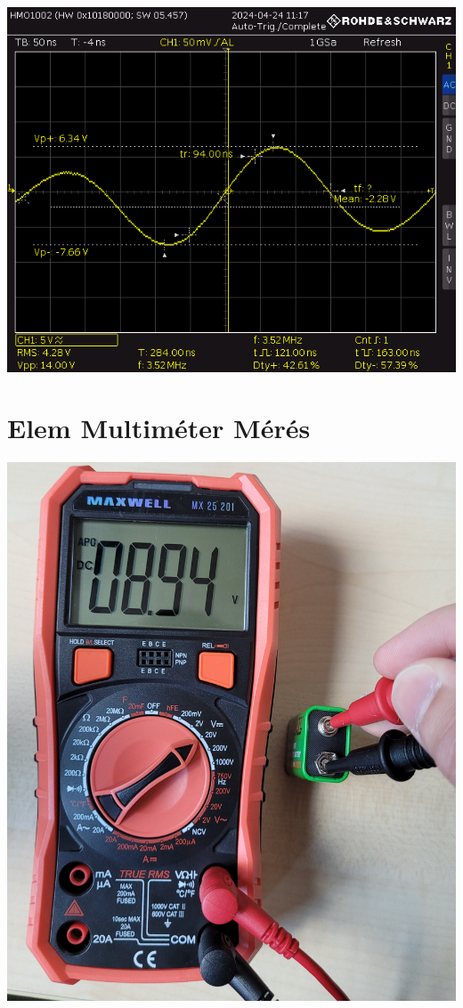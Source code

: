\documentclass[11pt, letterpaper, openany, oneside]{article}
\begin{document}
\includegraphics[width=\linewidth]{img/KITTYK04.PNG}

\section{Elem Multiméter Mérés}

\includegraphics[width=\linewidth]{img/bat.jpg}
\end{document}
